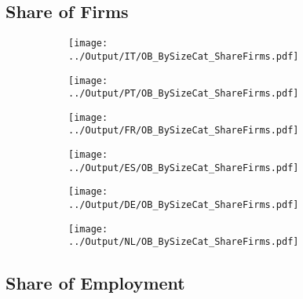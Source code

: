 \documentclass[12pt,notitlepage]{article}
\begin{document}
\subsection{Share of Firms}
\begin{figure}[!htpb]
\centering
\begin{subfigure}{.49\textwidth}
    \centering
 \texttt{[image: ../Output/IT/OB\_BySizeCat\_ShareFirms.pdf]}
\end{subfigure}%
\begin{subfigure}{.49\textwidth}
    \centering
 \texttt{[image: ../Output/PT/OB\_BySizeCat\_ShareFirms.pdf]}
\end{subfigure}
\begin{subfigure}{.49\textwidth}
    \centering
 \texttt{[image: ../Output/FR/OB\_BySizeCat\_ShareFirms.pdf]}
\end{subfigure}%
\begin{subfigure}{.49\textwidth}
    \centering
 \texttt{[image: ../Output/ES/OB\_BySizeCat\_ShareFirms.pdf]}
\end{subfigure}
\begin{subfigure}{.49\textwidth}
    \centering
 \texttt{[image: ../Output/DE/OB\_BySizeCat\_ShareFirms.pdf]}
\end{subfigure}
\begin{subfigure}{.49\textwidth}
    \centering
 \texttt{[image: ../Output/NL/OB\_BySizeCat\_ShareFirms.pdf]}
\end{subfigure}
\end{figure}
\clearpage


\subsection{Share of Employment}
\end{document}
